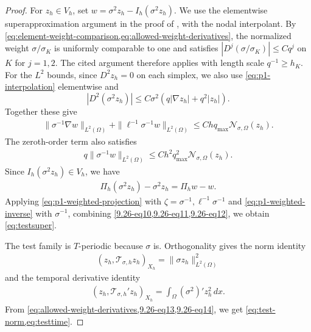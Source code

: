 \documentclass[print,wide,eng]{draft}
\begin{document}
\begin{proof}
For $z_h\in V_h$, set $w=\sigma^2z_h-I_h(\sigma^2z_h)$. We use the elementwise superapproximation argument in the proof of \cite[Theorem~2.1]{Demlow2010}, with the nodal interpolant. By \cref{eq:element-weight-comparison,eq:allowed-weight-derivatives}, the normalized weight $\sigma/\sigma_K$ is uniformly comparable to one and satisfies $|D^j(\sigma/\sigma_K)|\leq Cq^j$ on $K$ for $j=1,2$. The cited argument therefore applies with length scale $q^{-1}\geq h_K$. For the $L^2$ bounds, since $D^2z_h=0$  on each simplex, we also use \cref{eq:p1-interpolation} elementwise and $$|D^2(\sigma^2z_h)|\leq C\sigma^2(q|\nabla z_h|+q^2|z_h|).$$  Together these give
%
\begin{align}\label{9.26-eq10}
\|\sigma^{-1}\nabla w\|_{L^2(\Omega)}
+\|\ell^{-1}\sigma^{-1}w\|_{L^2(\Omega)}
\leq Chq_{\max}\mathcal N_{\sigma,\Omega}(z_h).
\end{align}
%
The zeroth-order term also satisfies\vspace{-2mm}
%
\begin{align}\label{9.26-eq11}
q\|\sigma^{-1}w\|_{L^2(\Omega)}
\leq Ch^2q_{\max}^2\mathcal N_{\sigma,\Omega}(z_h).
\end{align}
%
Since $I_h(\sigma^2z_h)\in V_h$, we have\vspace{-2mm}
%
\begin{align}\label{9.26-eq12}
\Pi_h(\sigma^2z_h)-\sigma^2z_h=\Pi_hw-w.
\end{align}
%
Applying \cref{eq:p1-weighted-projection} with $\zeta=\sigma^{-1},\ell^{-1}\sigma^{-1}$ and \cref{eq:p1-weighted-inverse} with $\sigma^{-1}$, combining \cref{9.26-eq10,9.26-eq11,9.26-eq12}, we obtain \cref{eq:testsuper}.

The test family is $T$-periodic because $\sigma$ is. Orthogonality gives the norm identity\vspace{-2mm}
%
\begin{align}\label{9.26-eq13}
(z_h,\mathscr{T}_{\sigma,h}z_h)_{X_h}=\|\sigma z_h\|_{L^2(\Omega)}^2
\end{align}
%
and the temporal derivative identity\vspace{-2mm}
%
\begin{align}\label{9.26-eq14}
(z_h,\mathscr{T}_{\sigma,h}'z_h)_{X_h}=\int_\Omega(\sigma^2)'z_h^2\,dx.
\end{align}
%
From \cref{eq:allowed-weight-derivatives,9.26-eq13,9.26-eq14}, we get \cref{eq:test-norm,eq:testtime}.


\end{proof}
\end{document}
